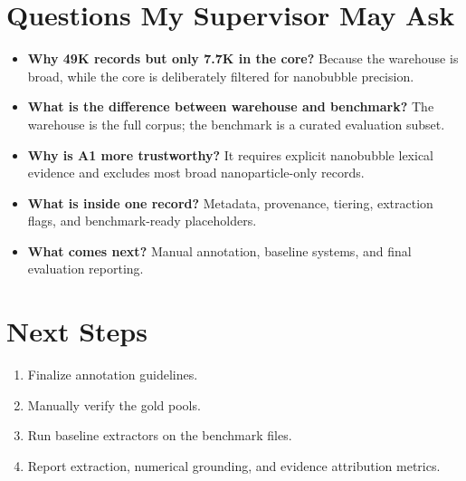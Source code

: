 \documentclass[11pt]{article}
\begin{document}
\section*{Questions My Supervisor May Ask}
\begin{itemize}[leftmargin=1.7em]
    \item \textbf{Why 49K records but only 7.7K in the core?} Because the warehouse is broad, while the core is deliberately filtered for nanobubble precision.
    \item \textbf{What is the difference between warehouse and benchmark?} The warehouse is the full corpus; the benchmark is a curated evaluation subset.
    \item \textbf{Why is A1 more trustworthy?} It requires explicit nanobubble lexical evidence and excludes most broad nanoparticle-only records.
    \item \textbf{What is inside one record?} Metadata, provenance, tiering, extraction flags, and benchmark-ready placeholders.
    \item \textbf{What comes next?} Manual annotation, baseline systems, and final evaluation reporting.
\end{itemize}

\section*{Next Steps}
\begin{enumerate}[leftmargin=1.7em]
    \item Finalize annotation guidelines.
    \item Manually verify the gold pools.
    \item Run baseline extractors on the benchmark files.
    \item Report extraction, numerical grounding, and evidence attribution metrics.
\end{enumerate}
\end{document}
